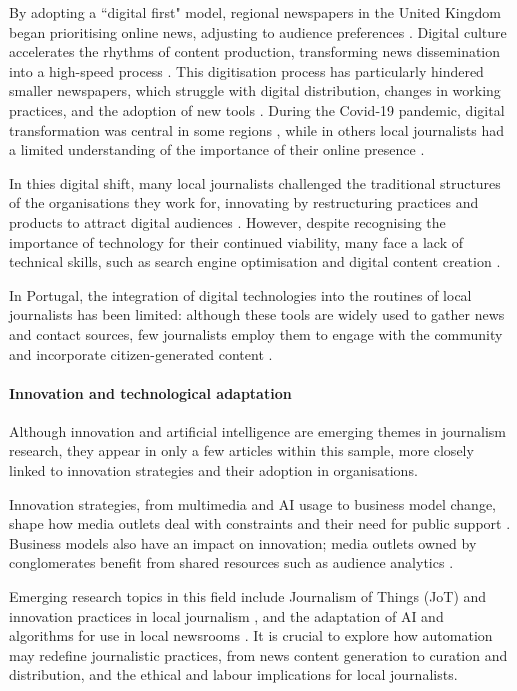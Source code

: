 \documentclass[english]{textolivre}
\begin{document}
By adopting a ``digital first" model, regional newspapers in the United Kingdom began prioritising online news, adjusting to audience preferences \cite{clark2023}. Digital culture accelerates the rhythms of content production, transforming news dissemination into a high-speed process \cite{hagen2022, hradziushka2020}. This digitisation process has particularly hindered smaller newspapers, which struggle with digital distribution, changes in working practices, and the adoption of new tools \cite{ali2019}. During the Covid-19 pandemic, digital transformation was central in some regions \cite{gurkan2023}, while in others local journalists had a limited understanding of the importance of their online presence \cite{ivask2024}.

In thies digital shift, many local journalists challenged the traditional structures of the organisations they work for, innovating by restructuring practices and products to attract digital audiences \cite{jenkins2021}. However, despite recognising the importance of technology for their continued viability, many face a lack of technical skills, such as search engine optimisation and digital content creation \cite{esa2022}.

In Portugal, the integration of digital technologies into the routines of local journalists has been limited: although these tools are widely used to gather news and contact sources, few journalists employ them to engage with the community and incorporate citizen-generated content \cite{jeronimo2022}.

\paragraph{Innovation and technological adaptation}
Although innovation and artificial intelligence are emerging themes in journalism research, they appear in only a few articles within this sample, more closely linked to innovation strategies and their adoption in organisations.

Innovation strategies, from multimedia and AI usage to business model change, shape how media outlets deal with constraints and their need for public support \cite{wilczek2021}. Business models also have an impact on innovation; media outlets owned by conglomerates benefit from shared resources such as audience analytics \cite{puijk2021}.

Emerging research topics in this field include Journalism of Things (JoT) and innovation practices in local journalism \cite{hamm2022}, and the adaptation of AI and algorithms for use in local newsrooms \cite{dralega2023}. It is crucial to explore how automation may redefine journalistic practices, from news content generation to curation and distribution, and the ethical and labour implications for local journalists.
\end{document}
